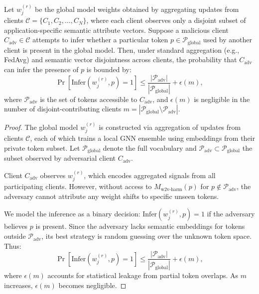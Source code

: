 \begin{theorem}
Let \(w_j^{(r)}\) be the global model weights obtained by aggregating updates from clients \(\mathcal{C} = \{C_1, C_2, \ldots, C_N\}\), where each client observes only a disjoint subset of application-specific semantic attribute vectors. Suppose a malicious client \(C_{\text{adv}} \in \mathcal{C}\) attempts to infer whether a particular token \(p \in \mathcal{P}_{\text{global}}\) used by another client is present in the global model. Then, under standard aggregation (e.g., FedAvg) and semantic vector disjointness across clients, the probability that \(C_{\text{adv}}\) can infer the presence of \(p\) is bounded by:
\[
\Pr[\text{Infer}(w_j^{(r)}, p) = 1] \leq \frac{|\mathcal{P}_{\text{adv}}|}{|\mathcal{P}_{\text{global}}|} + \epsilon(m),
\]
where \(\mathcal{P}_{\text{adv}}\) is the set of tokens accessible to \(C_{\text{adv}}\), and \(\epsilon(m)\) is negligible in the number of disjoint-contributing clients \(m = |\mathcal{P}_{\text{global}} \setminus \mathcal{P}_{\text{adv}}|\).
\end{theorem}

\begin{proof}
The global model \(w_j^{(r)}\) is constructed via aggregation of updates from clients \(\mathcal{C}\), each of which trains a local GNN ensemble using embeddings from their private token subset. Let \(\mathcal{P}_{\text{global}}\) denote the full vocabulary and \(\mathcal{P}_{\text{adv}} \subset \mathcal{P}_{\text{global}}\) the subset observed by adversarial client \(C_{\text{adv}}\).

Client \(C_{\text{adv}}\) observes \(w_j^{(r)}\), which encodes aggregated signals from all participating clients. However, without access to \(M_{\text{w2v-harm}}(p)\) for \(p \notin \mathcal{P}_{\text{adv}}\), the adversary cannot attribute any weight shifts to specific unseen tokens.

We model the inference as a binary decision: \(\text{Infer}(w_j^{(r)}, p) = 1\) if the adversary believes \(p\) is present. Since the adversary lacks semantic embeddings for tokens outside \(\mathcal{P}_{\text{adv}}\), its best strategy is random guessing over the unknown token space. Thus:
\[
\Pr[\text{Infer}(w_j^{(r)}, p) = 1] \leq \frac{|\mathcal{P}_{\text{adv}}|}{|\mathcal{P}_{\text{global}}|} + \epsilon(m),
\]
where \(\epsilon(m)\) accounts for statistical leakage from partial token overlaps. As \(m\) increases, \(\epsilon(m)\) becomes negligible.

\end{proof}


